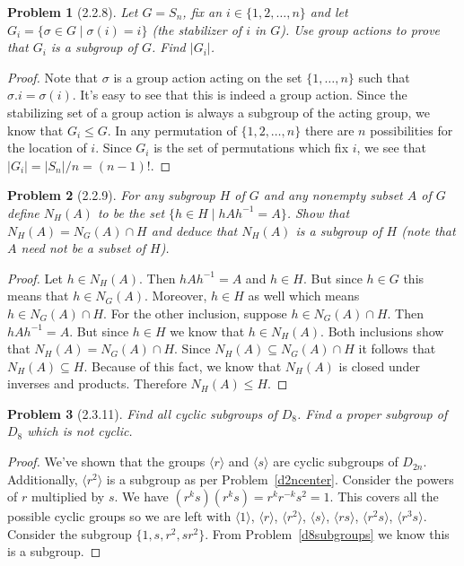 \documentclass{article}
\newtheorem{problem}{Problem}
\begin{document}
\begin{problem}[2.2.8]
Let $G = S_n$, fix an $i \in \{1, 2, \dots , n\}$ and let $G_i = \{\sigma \in G \mid \sigma(i) = i\}$ (the stabilizer of $i$ in $G$). Use group actions to prove that $G_i$ is a subgroup of $G$. Find $|G_i|$.
\end{problem}
\begin{proof}
Note that $\sigma$ is a group action acting on the set $\{1, \dots , n\}$ such that $\sigma . i = \sigma(i)$. It's easy to see that this is indeed a group action. Since the stabilizing set of a group action is always a subgroup of the acting group, we know that $G_i \leq G$. In any permutation of $\{1, 2, \dots , n\}$ there are $n$ possibilities for the location of $i$. Since $G_i$ is the set of permutations which fix $i$, we see that $|G_i| = |S_n|/n = (n-1)!$.
\end{proof}

\begin{problem}[2.2.9]
For any subgroup $H$ of $G$ and any nonempty subset $A$ of $G$ define $N_H(A)$ to be the set $\{h \in H \mid hAh^{-1} = A\}$. Show that $N_H(A) = N_G(A) \cap H$ and deduce that $N_H(A)$ is a subgroup of $H$ (note that $A$ need not be a subset of $H$).
\end{problem}
\begin{proof}
Let $h \in N_H(A)$. Then $hAh^{-1} = A$ and $h \in H$. But since $h \in G$ this means that $h \in N_G(A)$. Moreover, $h \in H$ as well which means $h \in N_G(A) \cap H$. For the other inclusion, suppose $h \in N_G(A) \cap H$. Then $hAh^{-1} = A$. But since $h \in H$ we know that $h \in N_H(A)$. Both inclusions show that $N_H(A) = N_G(A) \cap H$. Since $N_H(A) \subseteq N_G(A) \cap H$ it follows that $N_H(A) \subseteq H$. Because of this fact, we know that $N_H(A)$ is closed under inverses and products. Therefore $N_H(A) \leq H$.
\end{proof}

\begin{problem}[2.3.11]
Find all cyclic subgroups of $D_8$. Find a proper subgroup of $D_8$ which is not cyclic.
\end{problem}
\begin{proof}
We've shown that the groups $\langle r \rangle$ and $\langle s \rangle$ are cyclic subgroups of $D_{2n}$. Additionally, $\langle r^2 \rangle$ is a subgroup as per Problem~\ref{d2ncenter}. Consider the powers of $r$ multiplied by $s$. We have $(r^ks)(r^ks) = r^kr^{-k}s^2 = 1$. This covers all the possible cyclic groups so we are left with $\langle 1 \rangle$, $\langle r \rangle$, $\langle r^2 \rangle$, $\langle s \rangle$, $\langle rs \rangle$, $\langle r^2s \rangle$, $\langle r^3s \rangle$. Consider the subgroup $\{1, s, r^2, sr^2\}$. From Problem~\ref{d8subgroups} we know this is a subgroup.
\end{proof}
\end{document}
